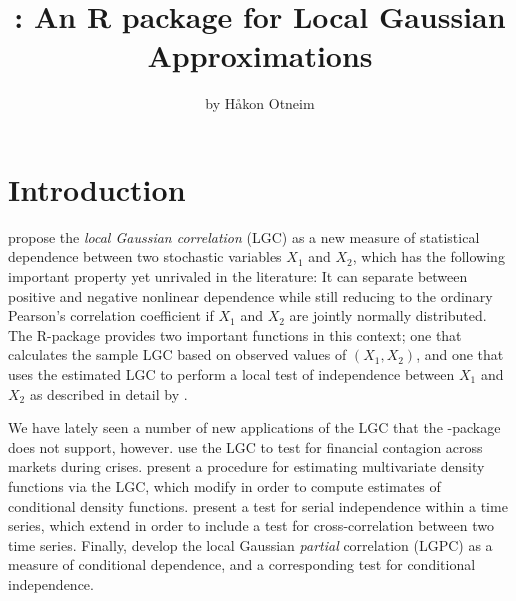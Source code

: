\title{: An R package for Local Gaussian Approximations}
\author{by H{\aa}kon Otneim}

\maketitle


\section{Introduction}

\citet{tjos:huft:2013} propose the \emph{local Gaussian correlation} (LGC) as a new measure of statistical dependence between two stochastic variables $X_1$ and $X_2$, which has the following important property yet unrivaled in the literature: It can separate between positive and negative nonlinear dependence while still reducing to the ordinary Pearson's correlation coefficient if $X_1$ and $X_2$ are jointly normally distributed. The R-package  \citep{bere:klep:tjos:2014} provides two important functions in this context; one that calculates the sample LGC based on observed values of $(X_1,X_2)$, and one that uses the estimated LGC to perform a local test of independence between $X_1$ and $X_2$ as described in detail by \citet{bere:tjos:2014}.  

We have lately seen a number of new applications of the LGC that the -package does not support, however. \citet{stov:tjos:huft:2014} use the LGC to test for financial contagion across markets during crises. \citet{otne:tjos:2017} present a procedure for estimating multivariate density functions via the LGC, which \citet{otne:tjos:2018} modify in order to compute estimates of conditional density functions. \citet{laca:tjos:2017} present a test for serial independence within a time series, which \citet{laca:tjos:2018} extend in order to include a test for cross-correlation between two time series. Finally, \citet{otne:tjos:2019} develop the local Gaussian \emph{partial} correlation (LGPC) as a measure of conditional dependence, and a corresponding test for conditional independence. 

